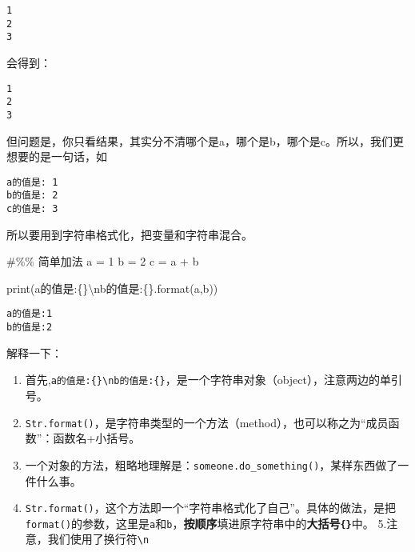 \documentclass[
  letterpaper,
  DIV=11,
  numbers=noendperiod]{scrreprt}
\newenvironment{Shaded}{\begin{snugshade}}{\end{snugshade}}
\newcommand{\BuiltInTok}[1]{\textcolor[rgb]{0.00,0.23,0.31}{#1}}
\newcommand{\CharTok}[1]{\textcolor[rgb]{0.13,0.47,0.30}{#1}}
\newcommand{\CommentTok}[1]{\textcolor[rgb]{0.37,0.37,0.37}{#1}}
\newcommand{\DecValTok}[1]{\textcolor[rgb]{0.68,0.00,0.00}{#1}}
\newcommand{\NormalTok}[1]{\textcolor[rgb]{0.00,0.23,0.31}{#1}}
\newcommand{\OperatorTok}[1]{\textcolor[rgb]{0.37,0.37,0.37}{#1}}
\newcommand{\SpecialCharTok}[1]{\textcolor[rgb]{0.37,0.37,0.37}{#1}}
\newcommand{\StringTok}[1]{\textcolor[rgb]{0.13,0.47,0.30}{#1}}
\providecommand{\tightlist}{%
  \setlength{\itemsep}{0pt}\setlength{\parskip}{0pt}}\usepackage{longtable,booktabs,array}
\begin{document}
\begin{verbatim}
1
2
3
\end{verbatim}

会得到：

\begin{verbatim}
1
2
3
\end{verbatim}

但问题是，你只看结果，其实分不清哪个是a，哪个是b，哪个是c。所以，我们更想要的是一句话，如

\begin{verbatim}
a的值是: 1
b的值是: 2
c的值是: 3
\end{verbatim}

所以要用到字符串格式化，把变量和字符串混合。

\begin{Shaded}
\begin{Highlighting}[]
\CommentTok{\#\%\% 简单加法}
\NormalTok{a }\OperatorTok{=} \DecValTok{1}
\NormalTok{b }\OperatorTok{=} \DecValTok{2}
\NormalTok{c }\OperatorTok{=}\NormalTok{ a }\OperatorTok{+}\NormalTok{ b}
\end{Highlighting}
\end{Shaded}

\begin{Shaded}
\begin{Highlighting}[]
\BuiltInTok{print}\NormalTok{(}\StringTok{\textquotesingle{}a的值是:}\SpecialCharTok{\{\}}\CharTok{\textbackslash{}n}\StringTok{b的值是:}\SpecialCharTok{\{\}}\StringTok{\textquotesingle{}}\NormalTok{.}\BuiltInTok{format}\NormalTok{(a,b))}
\end{Highlighting}
\end{Shaded}

\begin{verbatim}
a的值是:1
b的值是:2
\end{verbatim}

解释一下：

\begin{enumerate}
\def\labelenumi{\arabic{enumi}.}
\tightlist
\item
  首先,\texttt{\textquotesingle{}a的值是:\{\}\textbackslash{}nb的值是:\{\}\textquotesingle{}}，是一个字符串对象（object），注意两边的单引号。
\item
  \texttt{Str.format()}，是字符串类型的一个方法（method），也可以称之为``成员函数''：函数名+小括号。
\item
  一个对象的方法，粗略地理解是：\texttt{someone.do\_something()}，某样东西做了一件什么事。
\item
  \texttt{Str.format()}，这个方法即一个``字符串格式化了自己''。具体的做法，是把\texttt{format()}的参数，这里是\texttt{a}和\texttt{b}，\textbf{按顺序}填进原字符串中的\textbf{大括号\texttt{\{\}}}中。
  5.注意，我们使用了换行符\texttt{\textbackslash{}n}
\end{enumerate}
\end{document}
